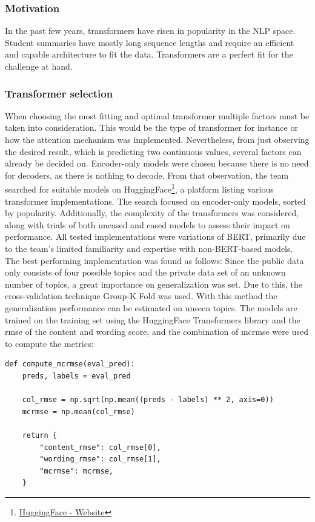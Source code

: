 \subsubsection{Motivation}
In the past few years, transformers have risen in popularity in the NLP space. 
Student summaries have mostly long sequence lengths and require an efficient and capable architecture to fit the data.
Transformers are a perfect fit for the challenge at hand.

\subsubsection{Transformer selection}
When choosing the most fitting and optimal transformer multiple factors must be taken into consideration.
This would be the type of transformer for instance or how the attention mechanism was implemented.
Nevertheless, from just observing the desired result, which is predicting two continuous values, several factors can already be decided on.
Encoder-only models were chosen because there is no need for decoders, as there is nothing to decode.
From that observation, the team searched for suitable models on HuggingFace\footnote{\href{https://huggingface.co/}{HuggingFace - Website}}, a platform listing various transformer implementations. The search focused on encoder-only models, sorted by popularity.
Additionally, the complexity of the transformers was considered, along with trials of both uncased and cased models to assess their impact on performance.
All tested implementations were variations of BERT, primarily due to the team's limited familiarity and expertise with non-BERT-based models.\\

\noindent The best performing implementation was found as follows:
Since the public data only consists of four possible topics and the private data set of an unknown number of topics, a great importance on generalization was set.
Due to this, the cross-validation technique Group-K Fold was used. With this method the generalization performance can be estimated on unseen topics.
The models are trained on the training set using the HuggingFace Transformers library and the \gls{rmse} of the content and wording score, and the combination of \gls{mcrmse} were used to compute the metrics:

\vspace{1em}

\begin{lstlisting}
def compute_mcrmse(eval_pred):
    preds, labels = eval_pred

    col_rmse = np.sqrt(np.mean((preds - labels) ** 2, axis=0))
    mcrmse = np.mean(col_rmse)

    return {
        "content_rmse": col_rmse[0],
        "wording_rmse": col_rmse[1],
        "mcrmse": mcrmse,
    }
\end{lstlisting}

